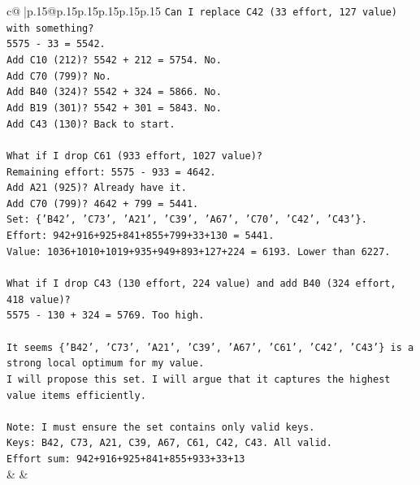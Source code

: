 \documentclass{article}
\begin{document}
{\begin{supertabular}{c@{$\;$}|p{.15\linewidth}@{}p{.15\linewidth}p{.15\linewidth}p{.15\linewidth}p{.15\linewidth}p{.15\linewidth}}
{{{\texttt{Can I replace C42 (33 effort, 127 value) with something?} \\
\texttt{5575 {-} 33 = 5542.} \\
\texttt{Add C10 (212)? 5542 + 212 = 5754. No.} \\
\texttt{Add C70 (799)? No.} \\
\texttt{Add B40 (324)? 5542 + 324 = 5866. No.} \\
\texttt{Add B19 (301)? 5542 + 301 = 5843. No.} \\
\texttt{Add C43 (130)? Back to start.} \\
\\ 
\texttt{What if I drop C61 (933 effort, 1027 value)?} \\
\texttt{Remaining effort: 5575 {-} 933 = 4642.} \\
\texttt{Add A21 (925)? Already have it.} \\
\texttt{Add C70 (799)? 4642 + 799 = 5441.} \\
\texttt{Set: \{'B42', 'C73', 'A21', 'C39', 'A67', 'C70', 'C42', 'C43'\}.} \\
\texttt{Effort: 942+916+925+841+855+799+33+130 = 5441.} \\
\texttt{Value: 1036+1010+1019+935+949+893+127+224 = 6193. Lower than 6227.} \\
\\ 
\texttt{What if I drop C43 (130 effort, 224 value) and add B40 (324 effort, 418 value)?} \\
\texttt{5575 {-} 130 + 324 = 5769. Too high.} \\
\\ 
\texttt{It seems \{'B42', 'C73', 'A21', 'C39', 'A67', 'C61', 'C42', 'C43'\} is a strong local optimum for my value.} \\
\texttt{I will propose this set. I will argue that it captures the highest value items efficiently.} \\
\\ 
\texttt{Note: I must ensure the set contains only valid keys.} \\
\texttt{Keys: B42, C73, A21, C39, A67, C61, C42, C43. All valid.} \\
\texttt{Effort sum: 942+916+925+841+855+933+33+13} \\
            }
        }
    }
    & & \\ \\


\end{supertabular}}
\end{document}
